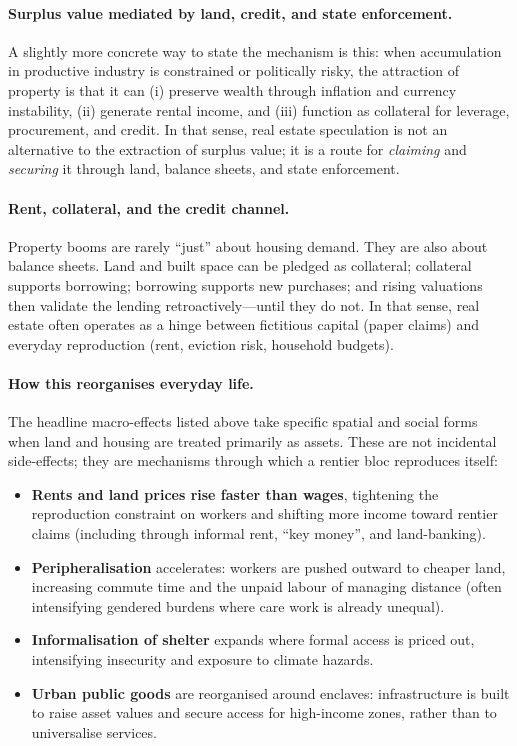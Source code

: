 \paragraph{Surplus value mediated by land, credit, and state enforcement.}
A slightly more concrete way to state the mechanism is this: when accumulation in productive industry is
constrained or politically risky, the attraction of property is that it can (i) preserve wealth through
inflation and currency instability, (ii) generate rental income, and (iii) function as collateral for leverage,
procurement, and credit. In that sense, real estate speculation is not an alternative to the extraction of
surplus value; it is a route for \emph{claiming} and \emph{securing} it through land, balance sheets, and state
enforcement.

\paragraph{Rent, collateral, and the credit channel.}
Property booms are rarely ``just'' about housing demand. They are also about balance sheets.
Land and built space can be pledged as collateral; collateral supports borrowing; borrowing supports
new purchases; and rising valuations then validate the lending retroactively---until they do not.
In that sense, real estate often operates as a hinge between fictitious capital (paper claims) and
everyday reproduction (rent, eviction risk, household budgets).

\paragraph{How this reorganises everyday life.}
The headline macro-effects listed above take specific spatial and social forms when land and housing are treated
primarily as assets. These are not incidental side-effects; they are mechanisms through which a rentier bloc
reproduces itself:

\begin{itemize}[leftmargin=1.5em]
  \item \textbf{Rents and land prices rise faster than wages}, tightening the reproduction constraint on workers
  and shifting more income toward rentier claims (including through informal rent, ``key money'', and land-banking).
  \item \textbf{Peripheralisation} accelerates: workers are pushed outward to cheaper land, increasing commute time
  and the unpaid labour of managing distance (often intensifying gendered burdens where care work is already unequal).
  \item \textbf{Informalisation of shelter} expands where formal access is priced out, intensifying insecurity and
  exposure to climate hazards.
  \item \textbf{Urban public goods} are reorganised around enclaves: infrastructure is built to raise asset values
  and secure access for high-income zones, rather than to universalise services.
\end{itemize}

